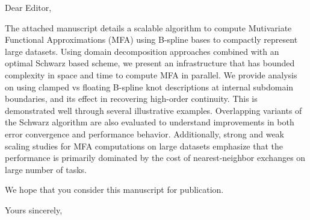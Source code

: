 \documentclass[]{letter}
\begin{document}

\begin{letter}{Dear Editor,}
\address{Mathematics and Computational Science Division,\\Argonne National Laboratory,\\9700 South Cass Avenue,\\Lemont,\\IL 60439, USA}

\opening{}

The attached manuscript details a scalable algorithm to compute Mutivariate Functional Approximations (MFA) using B-spline bases to compactly represent large datasets. Using domain decomposition approaches combined with an optimal Schwarz based scheme, we present an infrastructure that has bounded complexity in space and time to compute MFA in parallel. We provide analysis on using clamped vs floating B-spline knot descriptions at internal subdomain boundaries, and its effect in recovering high-order continuity. This is demonstrated well through several illustrative examples. Overlapping variants of the Schwarz algorithm are also evaluated to understand improvements in both error convergence and performance behavior. Additionally, strong and weak scaling studies for MFA computations on large datasets emphasize that the performance is primarily dominated by the cost of nearest-neighbor exchanges on large number of tasks. 


We hope that you consider this manuscript for publication.


\signature{Vijay S. Mahadevan}

\closing{Yours sincerely,}


\end{letter}
\end{document}
